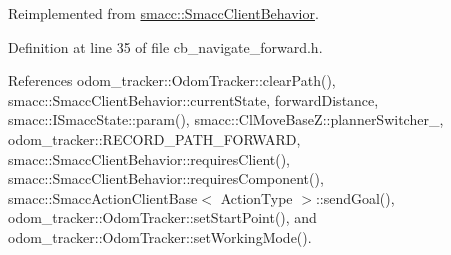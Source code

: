 Reimplemented from \hyperlink{classsmacc_1_1SmaccClientBehavior_a7962382f93987c720ad432fef55b123f}{smacc\+::\+Smacc\+Client\+Behavior}.



Definition at line 35 of file cb\+\_\+navigate\+\_\+forward.\+h.



References odom\+\_\+tracker\+::\+Odom\+Tracker\+::clear\+Path(), smacc\+::\+Smacc\+Client\+Behavior\+::current\+State, forward\+Distance, smacc\+::\+I\+Smacc\+State\+::param(), smacc\+::\+Cl\+Move\+Base\+Z\+::planner\+Switcher\+\_\+, odom\+\_\+tracker\+::\+R\+E\+C\+O\+R\+D\+\_\+\+P\+A\+T\+H\+\_\+\+F\+O\+R\+W\+A\+RD, smacc\+::\+Smacc\+Client\+Behavior\+::requires\+Client(), smacc\+::\+Smacc\+Client\+Behavior\+::requires\+Component(), smacc\+::\+Smacc\+Action\+Client\+Base$<$ Action\+Type $>$\+::send\+Goal(), odom\+\_\+tracker\+::\+Odom\+Tracker\+::set\+Start\+Point(), and odom\+\_\+tracker\+::\+Odom\+Tracker\+::set\+Working\+Mode().


